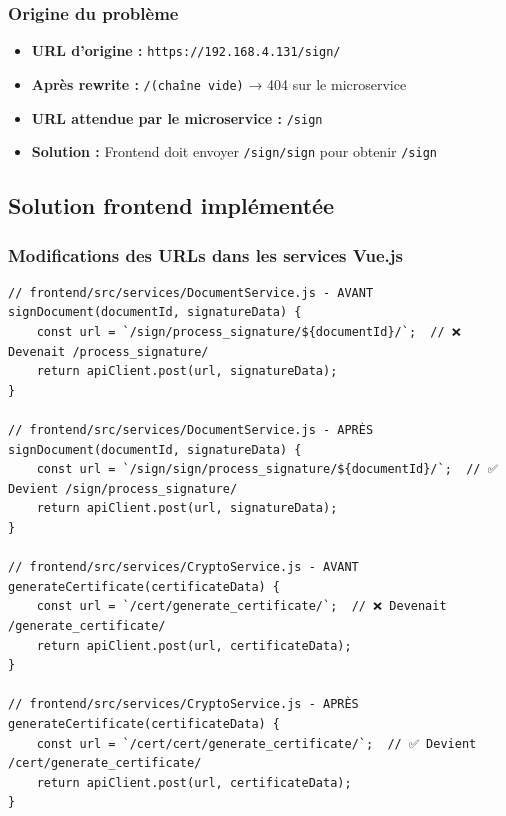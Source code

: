 \documentclass[12pt,a4paper]{article}
\begin{document}
\subsubsection{Origine du problème}
\begin{itemize}[leftmargin=*]
    \item \textbf{URL d'origine :} \texttt{https://192.168.4.131/sign/}
    \item \textbf{Après rewrite :} \texttt{/(chaîne vide)} → 404 sur le microservice
    \item \textbf{URL attendue par le microservice :} \texttt{/sign}
    \item \textbf{Solution :} Frontend doit envoyer \texttt{/sign/sign} pour obtenir \texttt{/sign}
\end{itemize}

\subsection{Solution frontend implémentée}

\subsubsection{Modifications des URLs dans les services Vue.js}

\begin{lstlisting}[style=javascript, caption={Correction des URLs dans le frontend}]
// frontend/src/services/DocumentService.js - AVANT
signDocument(documentId, signatureData) {
    const url = `/sign/process_signature/${documentId}/`;  // ❌ Devenait /process_signature/
    return apiClient.post(url, signatureData);
}

// frontend/src/services/DocumentService.js - APRÈS  
signDocument(documentId, signatureData) {
    const url = `/sign/sign/process_signature/${documentId}/`;  // ✅ Devient /sign/process_signature/
    return apiClient.post(url, signatureData);
}

// frontend/src/services/CryptoService.js - AVANT
generateCertificate(certificateData) {
    const url = `/cert/generate_certificate/`;  // ❌ Devenait /generate_certificate/
    return apiClient.post(url, certificateData);
}

// frontend/src/services/CryptoService.js - APRÈS
generateCertificate(certificateData) {
    const url = `/cert/cert/generate_certificate/`;  // ✅ Devient /cert/generate_certificate/
    return apiClient.post(url, certificateData);
}
\end{lstlisting}
\end{document}
